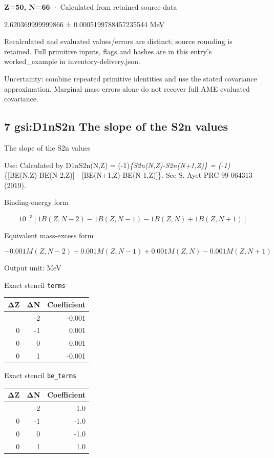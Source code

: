 \documentclass[
  11pt,
  letterpaper,
]{article}
\begin{document}
\textbf{Z=50, N=66} · Calculated from retained source data

2.620369999999866 ± 0.0005199788457235544 MeV

Recalculated and evaluated values/errors are distinct; source rounding
is retained. Full primitive inputs, flags and hashes are in this entry's
worked\_example in inventory-delivery.json.

Uncertainty: combine repeated primitive identities and use the stated
covariance approximation. Marginal mass errors alone do not recover full
AME evaluated covariance.

\subsection{7 gsi:D1nS2n The slope of the S2n
values}\label{gsid1ns2n-the-slope-of-the-s2n-values}

The slope of the S2n values

Use: Calculated by D1nS2n(N,Z) = (-1)\emph{\{S2n(N,Z)-S2n(N+1,Z)\} =
(-1)}\{{[}BE(N,Z)-BE(N-2,Z){]} - {[}BE(N+1,Z)-BE(N-1,Z){]}\}. See S.
Ayet PRC 99 064313 (2019).

Binding-energy form

\[
10^{-3}[1B(Z,N-2)-1B(Z,N-1)-1B(Z,N)+1B(Z,N+1)]
\]

Equivalent mass-excess form

\[
-0.001M(Z,N-2)+0.001M(Z,N-1)+0.001M(Z,N)-0.001M(Z,N+1)
\]

Output unit: MeV

Exact stencil \texttt{terms}

\begin{longtable}[]{@{}rrr@{}}
\toprule\noalign{}
ΔZ & ΔN & Coefficient \\
\midrule\noalign{}
\endhead
\bottomrule\noalign{}
\endlastfoot
0 & -2 & -0.001 \\
0 & -1 & 0.001 \\
0 & 0 & 0.001 \\
0 & 1 & -0.001 \\
\end{longtable}

Exact stencil \texttt{be\_terms}

\begin{longtable}[]{@{}rrr@{}}
\toprule\noalign{}
ΔZ & ΔN & Coefficient \\
\midrule\noalign{}
\endhead
\bottomrule\noalign{}
\endlastfoot
0 & -2 & 1.0 \\
0 & -1 & -1.0 \\
0 & 0 & -1.0 \\
0 & 1 & 1.0 \\
\end{longtable}
\end{document}
